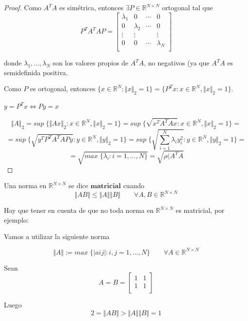 \begin{proof}
Como $A^TA$ es simétrica, entonces $\exists P \in \mathbb{R}^{N \times N}$ ortogonal tal que
\[ P^TA^TAP = \begin{bmatrix}
\lambda _1 & 0 & \cdots & 0 \\
0 & \lambda _2 & \cdots & 0 \\
\vdots & \vdots & & \vdots \\
0 & 0 & \cdots & \lambda _N \\
\end{bmatrix} \]

donde $\lambda _1, ..., \lambda _N$ son los valores propios de $A^TA$, no negativos (ya que $A^TA$ es semidefinida positiva.

Como $P$ es ortogonal, entonces $\lbrace x \in \mathbb{R}^N : \Vert x \Vert _2 = 1 \rbrace = \lbrace P^Tx : x \in \mathbb{R}^N, \Vert x \Vert _2 = 1 \rbrace$.

$y = P^Tx \Leftrightarrow Py = x$

\[ \Vert A \Vert _2
= sup \; \lbrace \Vert Ax \Vert _2 : x \in \mathbb{R}^N, \Vert x \Vert _2 = 1 \rbrace
= sup \; \lbrace \sqrt{x^TA^TAx} : x \in \mathbb{R}^N, \Vert x \Vert _2 = 1 \rbrace =\]
\[= sup \; \lbrace \sqrt{y^TP^TA^TAPy} : y \in \mathbb{R}^N, \Vert y \Vert _2 = 1 \rbrace
= sup \; \lbrace \sqrt{\sum_{i=1}^N \lambda _i y_i^2} : y \in \mathbb{R}^N, \Vert y \Vert _2 = 1 \rbrace =\]
\[= \sqrt{max \; \lbrace \lambda _i : i=1,...,N \rbrace }
= \sqrt{\rho (A^TA}
\]
\end{proof}

\begin{ndef}
Una norma en $\mathbb{R}^{N \times N}$ se dice $\textbf{matricial}$ cuando
\[ \Vert AB \Vert \leq \Vert A \Vert \Vert B \Vert \qquad \forall A,B \in \mathbb{R}^{N \times N} \]
\end{ndef}

Hay que tener en cuenta de que no toda norma en $\mathbb{R}^{N \times N}$ es matricial, por ejemplo:

Vamos a utilizar la siguiente norma

$$\Vert A \Vert := max \; \lbrace \vert a{ij} \vert : i, j = 1,...,N \rbrace \qquad \forall A \in \mathbb{R}^{N \times N}$$

Sean $$A = B = \begin{bmatrix}
1 & 1 \\
1 & 1 \\
\end{bmatrix}$$

Luego $$2 = \Vert AB \Vert > \Vert A \Vert \Vert B \Vert = 1$$


